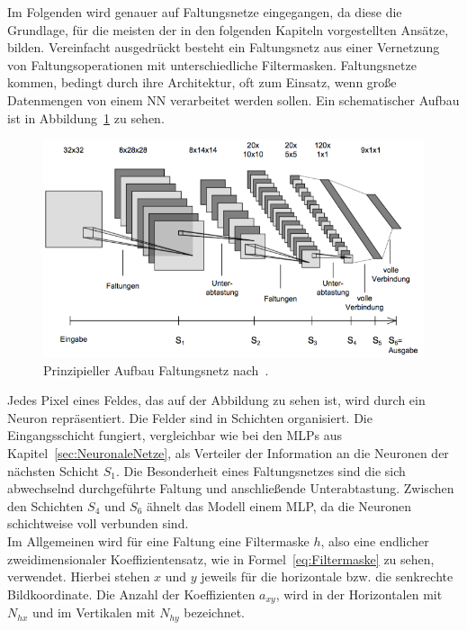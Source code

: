 \documentclass[times, 11pt,twocolumn]{article}
\begin{document}
 \label{sec:Faltungsnetze}
Im Folgenden wird genauer auf Faltungsnetze eingegangen, da diese die Grundlage, für die meisten der in den folgenden Kapiteln vorgestellten Ansätze, bilden. Vereinfacht ausgedrückt besteht ein Faltungsnetz aus einer Vernetzung von Faltungsoperationen mit unterschiedliche Filtermasken. Faltungsnetze kommen, bedingt durch ihre Architektur, oft zum Einsatz, wenn große Datenmengen von einem NN verarbeitet werden sollen. Ein schematischer Aufbau ist in Abbildung~\ref{fig:CNN} zu sehen. 

\begin{figure}
	\flushleft
	\includegraphics[width=\columnwidth]{Bilder/structure-cnn.jpg}
	\caption{Prinzipieller Aufbau Faltungsnetz nach~\cite{Osadchy}.}
	\label{fig:CNN}
\end{figure}

Jedes Pixel eines Feldes, das auf der Abbildung zu sehen ist, wird durch ein Neuron repräsentiert. Die Felder sind in Schichten organisiert. Die Eingangsschicht fungiert, vergleichbar wie bei den MLPs aus Kapitel~\ref{sec:NeuronaleNetze}, als Verteiler der Information an die Neuronen der nächsten Schicht $S_1$. Die Besonderheit eines Faltungsnetzes sind die sich abwechselnd durchgeführte Faltung und anschließende Unterabtastung. Zwischen den Schichten $S_4$ und $S_6$ ähnelt das Modell einem MLP, da die Neuronen schichtweise voll verbunden sind.\\

Im Allgemeinen wird für eine Faltung eine Filtermaske $h$, also eine endlicher zweidimensionaler Koeffizientensatz, wie in Formel~\ref{eq:Filtermaske} zu sehen, verwendet. Hierbei stehen $x$ und $y$ jeweils für die horizontale bzw. die senkrechte Bildkoordinate. Die Anzahl der Koeffizienten $a_{xy}$, wird in der Horizontalen mit $N_{hx}$ und im Vertikalen mit $N_{hy}$ bezeichnet. 
\end{document}
